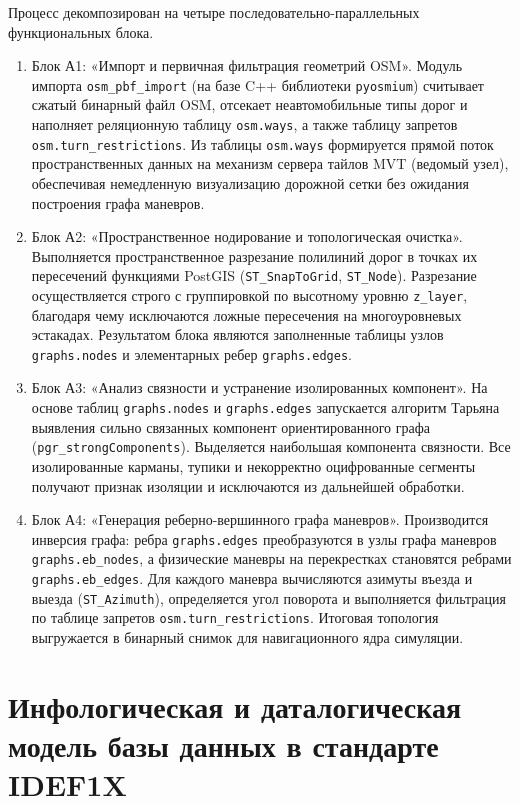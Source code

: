 Процесс декомпозирован на четыре последовательно-параллельных функциональных блока.
\begin{enumerate}
    \item Блок А1: «Импорт и первичная фильтрация геометрий OSM». Модуль импорта \texttt{osm\_pbf\_import} (на базе C++ библиотеки \texttt{pyosmium}) считывает сжатый бинарный файл OSM, отсекает неавтомобильные типы дорог и наполняет реляционную таблицу \texttt{osm.ways}, а также таблицу запретов \texttt{osm.turn\_restrictions}. Из таблицы \texttt{osm.ways} формируется прямой поток пространственных данных на механизм сервера тайлов MVT (ведомый узел), обеспечивая немедленную визуализацию дорожной сетки без ожидания построения графа маневров.
    \item Блок А2: «Пространственное нодирование и топологическая очистка». Выполняется пространственное разрезание полилиний дорог в точках их пересечений функциями PostGIS (\texttt{ST\_SnapToGrid}, \texttt{ST\_Node}). Разрезание осуществляется строго с группировкой по высотному уровню \texttt{z\_layer}, благодаря чему исключаются ложные пересечения на многоуровневых эстакадах. Результатом блока являются заполненные таблицы узлов \texttt{graphs.nodes} и элементарных ребер \texttt{graphs.edges}.
    \item Блок А3: «Анализ связности и устранение изолированных компонент». На основе таблиц \texttt{graphs.nodes} и \texttt{graphs.edges} запускается алгоритм Тарьяна выявления сильно связанных компонент ориентированного графа (\texttt{pgr\_strongComponents}). Выделяется наибольшая компонента связности. Все изолированные карманы, тупики и некорректно оцифрованные сегменты получают признак изоляции и исключаются из дальнейшей обработки.
    \item Блок А4: «Генерация реберно-вершинного графа маневров». Производится инверсия графа: ребра \texttt{graphs.edges} преобразуются в узлы графа маневров \texttt{graphs.eb\_nodes}, а физические маневры на перекрестках становятся ребрами \texttt{graphs.eb\_edges}. Для каждого маневра вычисляются азимуты въезда и выезда (\texttt{ST\_Azimuth}), определяется угол поворота и выполняется фильтрация по таблице запретов \texttt{osm.turn\_restrictions}. Итоговая топология выгружается в бинарный снимок для навигационного ядра симуляции.
\end{enumerate}

\section{Инфологическая и даталогическая модель базы данных в стандарте IDEF1X}
\label{sec:idef1x_modeling}

